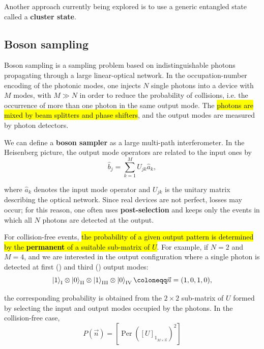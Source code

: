 Another approach currently being explored is to use a generic entangled state called a \textbf{cluster state}.

\subsection{Boson sampling}\label{subsec:17-boson-sampling}

Boson sampling is a sampling problem based on indistinguishable photons propagating through a large linear-optical network. In the occupation-number encoding of the photonic modes, one injects $N$ single photons into a device with $M$ modes, with $M \gg N$ in order to reduce the probability of collisions, i.e. the occurrence of more than one photon in the same output mode. The \hl{photons are mixed by beam splitters and phase shifters}, and the output modes are measured by photon detectors. 


We can define a \textbf{boson sampler} as a large multi-path interferometer. In the Heisenberg picture, the output mode operators are related to the input ones by
\begin{equation}
\hat{b}_j=\sum_{k=1}^{M} U_{jk}\hat{a}_k,
\end{equation}

where $\hat{a}_k$ denotes the input mode operator and $U_{jk}$ is the unitary matrix describing the optical network. Since real devices are not perfect, losses may occur; for this reason, one often uses \textbf{post-selection} and keeps only the events in which all $N$ photons are detected at the output.

For collision-free events, \hl{the probability of a given output pattern is determined by the \textbf{permanent} of a suitable sub-matrix of $U$}. For example, if $N=2$ and $M=4$, and we are interested in the output configuration where a single photon is detected at first () and third () output modes:
\begin{equation}
\ket{1}_\text{\Rnum{1}}\otimes\ket{0}_\text{\Rnum{2}}\otimes
\ket{1}_\text{\Rnum{3}}\otimes\ket{0}_\text{\Rnum{4}}
\coloneqq
\vec{n}=(1,0,1,0),
\end{equation}

the corresponding probability is obtained from the $2\times 2$ sub-matrix of $U$ formed by selecting the input and output modes occupied by the photons. In the collision-free case,
\begin{equation}
P(\vec{n})=
\left[
    \operatorname{Per} ([U]_{1_{M\times\vec{n}}})^2
\right]
\end{equation}

